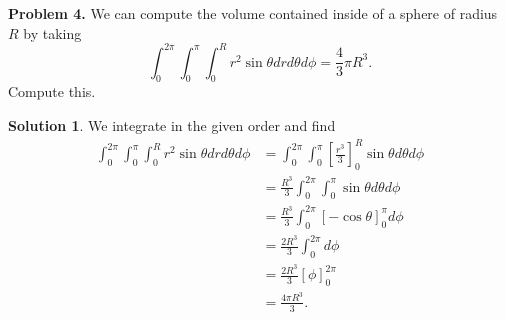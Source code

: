 \documentclass[12pt]{report} %
\theoremstyle{definition}
\newtheorem{solution}{Solution}
\begin{document}
\noindent\textbf{Problem 4.} We can compute the volume contained inside of a sphere of radius $R$ by taking
\[
\int_0^{2\pi} \int_0^\pi \int_0^R r^2 \sin \theta dr d\theta d\phi = \frac{4}{3}\pi R^3.
\]
Compute this.

\begin{solution}
We integrate in the given order and find
\begin{align*}
    \int_0^{2\pi} \int_0^\pi \int_0^R r^2\sin \theta dr d\theta d\phi &= \int_0^{2\pi} \int_0^\pi \left[ \frac{r^3}{3}\right]_0^R \sin \theta d\theta d\phi\\
    &= \frac{R^3}{3} \int_0^{2\pi} \int_0^\pi \sin \theta d\theta d \phi\\
    &= \frac{R^3}{3} \int_0^{2\pi} \left[ -\cos \theta \right]_0^\pi d\phi\\
    &=\frac{2R^3}{3} \int_0^{2\pi} d\phi\\
    &=\frac{2R^3}{3} \left[ \phi\right]_0^{2\pi}\\
    &= \frac{4\pi R^3}{3}.
\end{align*}
\end{solution}
\end{document}
